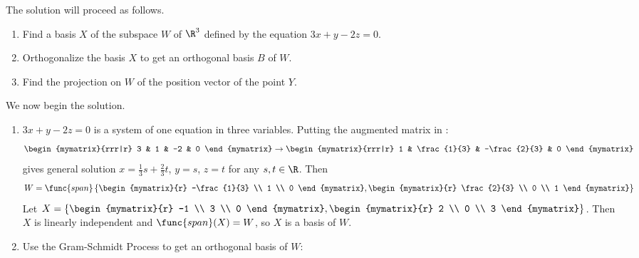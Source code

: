 \begin{solution}
The solution will proceed as follows.
\begin{enumerate}
\item Find a basis $X$ of the subspace $W$ of $\R^3$ defined by
the equation  $3x+y-2z=0$.
\item Orthogonalize the basis $X$ to get an orthogonal basis
$B$ of $W$.
\item Find the projection on $W$ of the position vector of
the point $Y$.
\end{enumerate}

We now begin the solution.
\begin{enumerate}
\item $3x+y-2z=0$ is a system of one equation in three variables.
Putting the augmented matrix in {\rref}:
\[
\begin{mymatrix}{rrr|r} 3 & 1 & -2 & 0 \end{mymatrix}
\rightarrow
\begin{mymatrix}{rrr|r} 1 & \frac{1}{3} & -\frac{2}{3} & 0 \end{mymatrix}
\]
gives general solution $x=\frac{1}{3}s+\frac{2}{3}t$, $y=s$, $z=t$
for any $s,t\in\R$.
Then  
\[
W=\func{span} \left\{
\begin{mymatrix}{r} -\frac{1}{3} \\ 1 \\ 0 \end{mymatrix},
\begin{mymatrix}{r} \frac{2}{3} \\ 0 \\ 1 \end{mymatrix}\right\}
\]
Let
$X=\left\{
\begin{mymatrix}{r} -1 \\ 3 \\ 0 \end{mymatrix},
\begin{mymatrix}{r} 2 \\ 0 \\ 3 \end{mymatrix}\right\}$.
Then $X$ is linearly independent and $\func{span}(X)=W$, so $X$ is a basis of $W$.

\item Use the Gram-Schmidt Process to get an
orthogonal basis of $W$: 



\end{enumerate}
\end{solution}
